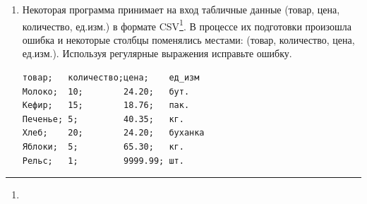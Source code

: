 \begin{enumerate}
    \item Некоторая программа принимает на вход табличные данные (товар, цена, количество, ед.изм.) в формате CSV\footnote{}. В процессе их подготовки произошла ошибка и некоторые столбцы поменялись местами: (товар, количество, цена, ед.изм.). Используя регулярные выражения исправьте ошибку.
\begin{verbatim}
товар;   количество;цена;    ед_изм
Молоко;  10;        24.20;   бут.
Кефир;   15;        18.76;   пак.
Печенье; 5;         40.35;   кг.
Хлеб;    20;        24.20;   буханка
Яблоки;  5;         65.30;   кг.
Рельс;   1;         9999.99; шт.
\end{verbatim}
\end{enumerate}
